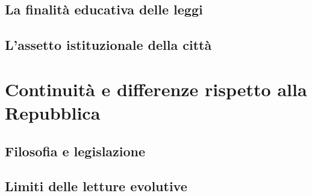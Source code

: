 \subsection{La finalità educativa delle leggi}

\subsection{L'assetto istituzionale della città}

\section{Continuità e differenze rispetto alla Repubblica}

\subsection{Filosofia e legislazione}

\subsection{Limiti delle letture evolutive}
